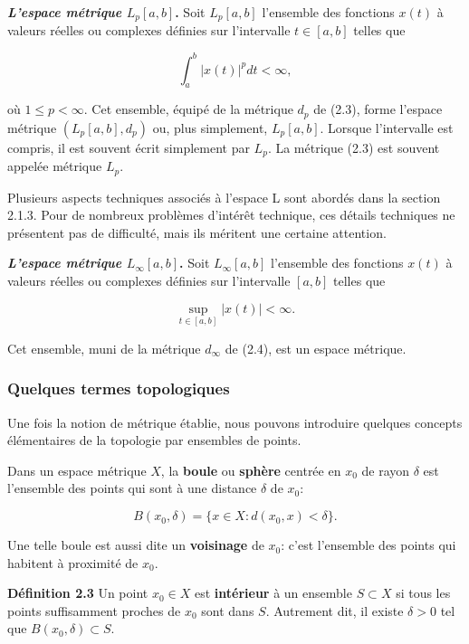 \documentclass[11pt,twoside,a4paper]{article}
\begin{document}
\textbf{\textit{L'espace métrique} $L_p[a, b]$.} Soit $L_p[a, b]$ l'ensemble des fonctions $x(t)$ à valeurs réelles ou complexes définies sur l'intervalle $t \in [a, b]$ telles que

\begin{equation*}
  \int_{a}^{b} |x(t)|^p dt < \infty,
\end{equation*}

où $1 \leq p < \infty$. Cet ensemble, équipé de la métrique $d_p$ de (2.3), forme l'espace métrique $(L_p[a, b], d_p)$ ou, plus simplement, $L_p[a, b]$. Lorsque l'intervalle est compris, il est souvent écrit simplement par $L_p$. La métrique (2.3) est souvent appelée métrique $L_p$.

Plusieurs aspects techniques associés à l'espace L sont abordés dans la section 2.1.3. Pour de nombreux problèmes d'intérêt technique, ces détails techniques ne présentent pas de difficulté, mais ils méritent une certaine attention.

\textbf{\textit{L'espace métrique} $L_\infty[a, b]$.} Soit $L_\infty[a, b]$ l'ensemble des fonctions $x(t)$ à valeurs réelles ou complexes définies sur l'intervalle $[a, b]$ telles que

\begin{equation*}
  \sup_{t \in [a, b]} |x(t)| < \infty.
\end{equation*}

Cet ensemble, muni de la métrique $d_\infty$ de (2.4), est un espace métrique.

\subsubsection{Quelques termes topologiques}
Une fois la notion de métrique établie, nous pouvons introduire quelques concepts élémentaires de la topologie par ensembles de points.

Dans un espace métrique $X$, la \textbf{boule} ou \textbf{sphère} centrée en $x_0$ de rayon $\delta$ est l'ensemble des points qui sont à une distance $\delta$ de $x_0$:

\begin{equation}
  B(x_0, \delta) = \{x \in X : d(x_0, x) < \delta\}.
\end{equation}

Une telle boule est aussi dite un \textbf{voisinage} de $x_0$: c'est l'ensemble des points qui habitent à proximité de $x_0$.

\textbf{Définition 2.3} Un point $x_0 \in X$ est \textbf{intérieur} à un ensemble $S \subset X$ si tous les points suffisamment proches de $x_0$ sont dans $S$. Autrement dit, il existe $\delta > 0$ tel que $B(x_0, \delta) \subset S$.
\end{document}
